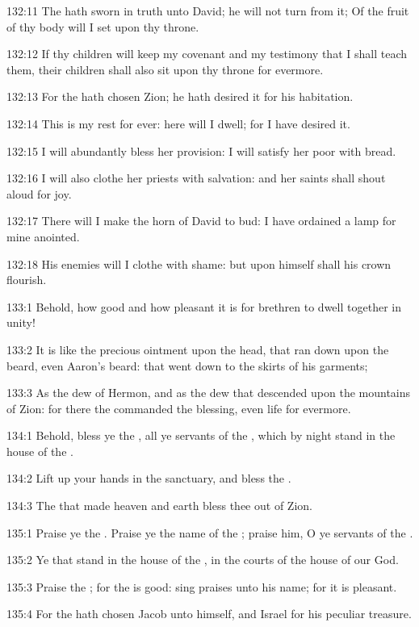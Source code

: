 132:11 The \LORD hath sworn in truth unto David; he will not turn from it; Of the fruit of thy body will I set upon thy throne.

132:12 If thy children will keep my covenant and my testimony that I shall teach them, their children shall also sit upon thy throne for evermore.

132:13 For the \LORD hath chosen Zion; he hath desired it for his habitation.

132:14 This is my rest for ever: here will I dwell; for I have desired it.

132:15 I will abundantly bless her provision: I will satisfy her poor with bread.

132:16 I will also clothe her priests with salvation: and her saints shall shout aloud for joy.

132:17 There will I make the horn of David to bud: I have ordained a lamp for mine anointed.

132:18 His enemies will I clothe with shame: but upon himself shall his crown flourish.



133:1 Behold, how good and how pleasant it is for brethren to dwell together in unity!

133:2 It is like the precious ointment upon the head, that ran down upon the beard, even Aaron's beard: that went down to the skirts of his garments;

133:3 As the dew of Hermon, and as the dew that descended upon the mountains of Zion: for there the \LORD commanded the blessing, even life for evermore.



134:1 Behold, bless ye the \LORD, all ye servants of the \LORD, which by night stand in the house of the \LORD.

134:2 Lift up your hands in the sanctuary, and bless the \LORD.

134:3 The \LORD that made heaven and earth bless thee out of Zion.



135:1 Praise ye the \LORD. Praise ye the name of the \LORD; praise him, O ye servants of the \LORD.

135:2 Ye that stand in the house of the \LORD, in the courts of the house of our God.

135:3 Praise the \LORD; for the \LORD is good: sing praises unto his name; for it is pleasant.

135:4 For the \LORD hath chosen Jacob unto himself, and Israel for his peculiar treasure.

